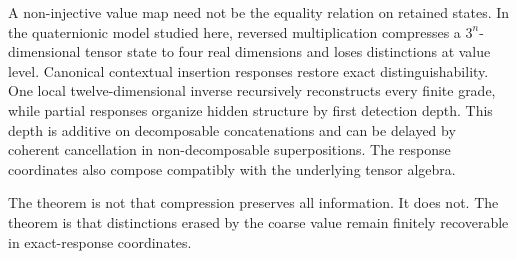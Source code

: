 A non-injective value map need not be the equality relation on retained states.  In the quaternionic model studied here, reversed multiplication compresses a $3^n$-dimensional tensor state to four real dimensions and loses distinctions at value level.  Canonical contextual insertion responses restore exact distinguishability.  One local twelve-dimensional inverse recursively reconstructs every finite grade, while partial responses organize hidden structure by first detection depth.  This depth is additive on decomposable concatenations and can be delayed by coherent cancellation in non-decomposable superpositions.  The response coordinates also compose compatibly with the underlying tensor algebra.

The theorem is not that compression preserves all information.  It does not.  The theorem is that distinctions erased by the coarse value remain finitely recoverable in exact-response coordinates.
